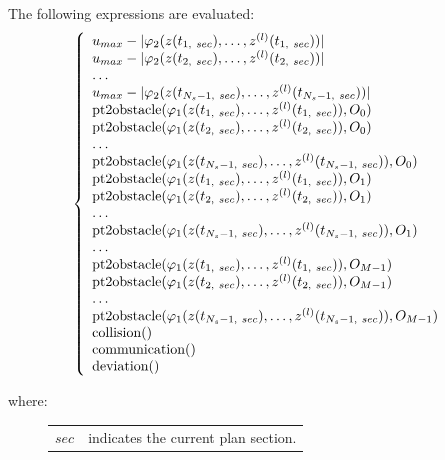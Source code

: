 \documentclass[letterpaper,10pt,english]{sphinxmanual}
\begin{document}
\begin{fulllineitems}
\begin{fulllineitems}
The following expressions are evaluated:
\begin{gather}
\begin{split}\left\lbrace\begin{array}{lcl}
u_{max} - |\varphi_2(z(t_{1,\ sec}),\dotsc,z^{(l)}(t_{1,\ sec}))|\\
u_{max} - |\varphi_2(z(t_{2,\ sec}),\dotsc,z^{(l)}(t_{2,\ sec}))|\\
\dotsc\\
u_{max} - |\varphi_2(z(t_{N_s-1,\ sec}),\dotsc,z^{(l)}(t_{N_s-1,\ sec}))|\\
\mathrm{pt2obstacle}(\varphi_1(z(t_{1,\ sec}),\dotsc,z^{(l)}(t_{1,\ sec})), O_0)\\
\mathrm{pt2obstacle}(\varphi_1(z(t_{2,\ sec}),\dotsc,z^{(l)}(t_{2,\ sec})), O_0)\\
\dotsc\\
\mathrm{pt2obstacle}(\varphi_1(z(t_{N_s-1,\ sec}),
\dotsc,z^{(l)}(t_{N_s-1,\ sec})), O_0)\\
\mathrm{pt2obstacle}(\varphi_1(z(t_{1,\ sec}),\dotsc,z^{(l)}(t_{1,\ sec})), O_1)\\
\mathrm{pt2obstacle}(\varphi_1(z(t_{2,\ sec}),\dotsc,z^{(l)}(t_{2,\ sec})), O_1)\\
\dotsc\\
\mathrm{pt2obstacle}(\varphi_1(z(t_{N_s-1,\ sec}),
\dotsc,z^{(l)}(t_{N_s-1,\ sec})), O_1)\\
\dotsc\\
\mathrm{pt2obstacle}(\varphi_1(z(t_{1,\ sec}),
\dotsc,z^{(l)}(t_{1,\ sec})), O_{M-1})\\
\mathrm{pt2obstacle}(\varphi_1(z(t_{2,\ sec}),
\dotsc,z^{(l)}(t_{2,\ sec})), O_{M-1})\\
\dotsc\\
\mathrm{pt2obstacle}(\varphi_1(z(t_{N_s-1,\ sec}),
\dotsc,z^{(l)}(t_{N_s-1,\ sec})), O_{M-1})\\
\mathrm{collision()}\\
\mathrm{communication()}\\
\mathrm{deviation()}
\end{array}\right.\end{split}\notag
\end{gather}\begin{description}
\item[{where:}] \leavevmode
\begin{tabulary}{\linewidth}{|L|L|}
\hline

\(sec\)
 & 
indicates the current plan section.
\\


\end{tabulary}
\end{description}
\end{fulllineitems}
\end{fulllineitems}
\end{document}
